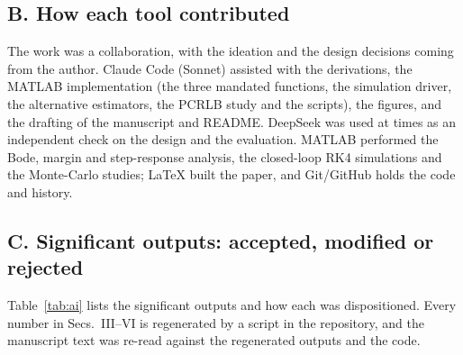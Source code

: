 \documentclass[conference]{IEEEtran}
\begin{document}
\subsection*{B. How each tool contributed}
The work was a collaboration, with the ideation and the design decisions coming from the author. Claude Code (Sonnet) assisted with the derivations, the MATLAB implementation (the three mandated functions, the simulation driver, the alternative estimators, the PCRLB study and the scripts), the figures, and the drafting of the manuscript and README. DeepSeek was used at times as an independent check on the design and the evaluation. MATLAB performed the Bode, margin and step-response analysis, the closed-loop RK4 simulations and the Monte-Carlo studies; LaTeX built the paper, and Git/GitHub holds the code and history.

\subsection*{C. Significant outputs: accepted, modified or rejected}
Table~\ref{tab:ai} lists the significant outputs and how each was dispositioned. Every number in Secs.~III--VI is regenerated by a script in the repository, and the manuscript text was re-read against the regenerated outputs and the code.
\end{document}
